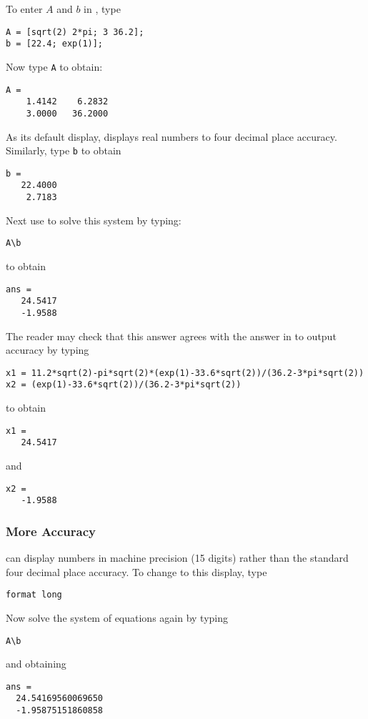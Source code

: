 \documentclass{ximera}
\begin{document}
To enter $A$ and $b$ in \Matlab, type
\begin{verbatim}
A = [sqrt(2) 2*pi; 3 36.2];
b = [22.4; exp(1)];
\end{verbatim}
Now type {\tt A} to obtain:
\begin{verbatim}
A =
    1.4142    6.2832
    3.0000   36.2000
\end{verbatim}
As its default display, \Matlab displays real numbers to four
decimal place accuracy.  Similarly, type {\tt b} to obtain
\begin{verbatim}
b =
   22.4000
    2.7183
\end{verbatim}


Next use \Matlab to solve this system by typing:
\begin{verbatim}
A\b
\end{verbatim}
to obtain
\begin{verbatim}
ans =
   24.5417
   -1.9588
\end{verbatim}

The reader may check that this answer agrees with the answer in
 to \Matlab output accuracy by typing
\begin{verbatim}
x1 = 11.2*sqrt(2)-pi*sqrt(2)*(exp(1)-33.6*sqrt(2))/(36.2-3*pi*sqrt(2))
x2 = (exp(1)-33.6*sqrt(2))/(36.2-3*pi*sqrt(2))
\end{verbatim}
to obtain
\begin{verbatim}
x1 =
   24.5417
\end{verbatim}
and
\begin{verbatim}
x2 =
   -1.9588
\end{verbatim}


\subsubsection*{More Accuracy}

\Matlab can display numbers in machine precision (15 digits) rather
than the standard four decimal place accuracy. To change to this
display, type
\begin{verbatim}
format long
\end{verbatim} 
Now solve the system of equations  again by typing
\begin{verbatim}
A\b
\end{verbatim}  \index{\computer!$\backslash$}
and obtaining
\begin{verbatim}
ans =
  24.54169560069650
  -1.95875151860858
\end{verbatim}
\end{document}
